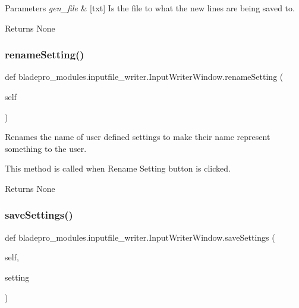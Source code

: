 \begin{DoxyParams}{Parameters}
{\em gen\+\_\+file} & \mbox{[}txt\mbox{]} Is the file to what the new lines are being saved to. \\
\hline
\end{DoxyParams}
\begin{DoxyReturn}{Returns}
None 
\end{DoxyReturn}
\hypertarget{a00073_a464a8ac16bcb67d41a6d91ee8b51acf2}{}\label{a00073_a464a8ac16bcb67d41a6d91ee8b51acf2} 
\subsubsection{\texorpdfstring{rename\+Setting()}{renameSetting()}}
{\footnotesize\ttfamily def bladepro\+\_\+modules.\+inputfile\+\_\+writer.\+Input\+Writer\+Window.\+rename\+Setting (\begin{DoxyParamCaption}\item[{}]{self }\end{DoxyParamCaption})}



Renames the name of user defined settings to make their name represent something to the user. 

This method is called when Rename Setting button is clicked.

\begin{DoxyReturn}{Returns}
None 
\end{DoxyReturn}
\hypertarget{a00073_a723573fade09f206a9c89569885558c1}{}\label{a00073_a723573fade09f206a9c89569885558c1} 
\subsubsection{\texorpdfstring{save\+Settings()}{saveSettings()}}
{\footnotesize\ttfamily def bladepro\+\_\+modules.\+inputfile\+\_\+writer.\+Input\+Writer\+Window.\+save\+Settings (\begin{DoxyParamCaption}\item[{}]{self,  }\item[{}]{setting }\end{DoxyParamCaption})}



